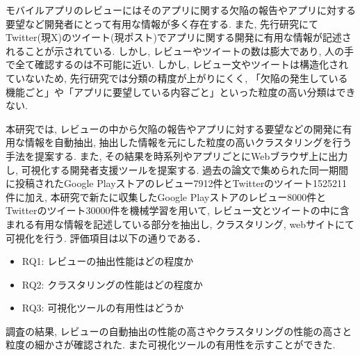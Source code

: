 
モバイルアプリのレビューにはそのアプリに関する欠陥の報告やアプリに対する要望など開発者にとって有用な情報が多く存在する. また, 先行研究にてTwitter(現X)のツイート(現ポスト)でアプリに関する開発に有用な情報が記述されることが示されている. しかし, レビューやツイートの数は膨大であり, 人の手で全て確認するのは不可能に近い. 
しかし, レビュー文やツイートは構造化されていないため, 先行研究では分類の精度が上がりにくく, 「欠陥の発生している機能ごと」や「アプリに要望している内容ごと」といった粒度の高い分類はできない. 

本研究では, レビューの中から欠陥の報告やアプリに対する要望などの開発に有用な情報を自動抽出, 抽出した情報を元にした粒度の高いクラスタリングを行う手法を提案する. また, その結果を時系列やアプリごとにWebブラウザ上に出力し, 可視化する開発者支援ツールを提案する.
過去の論文で集められた同一期間に投稿されたGoogle Playストアのレビュー7912件とTwitterのツイート1525211件に加え, 本研究で新たに収集したGoogle Playストアのレビュー8000件とTwitterのツイート30000件を機械学習を用いて, レビュー文とツイートの中に含まれる有用な情報を記述している部分を抽出し, クラスタリング, webサイトにて可視化を行う. 評価項目は以下の通りである．
\begin{itemize}
    \item RQ1: レビューの抽出性能はどの程度か
    \item RQ2: クラスタリングの性能はどの程度か
    \item RQ3: 可視化ツールの有用性はどうか
\end{itemize}

調査の結果, レビューの自動抽出の性能の高さやクラスタリングの性能の高さと粒度の細かさが確認された. また可視化ツールの有用性を示すことができた. 
